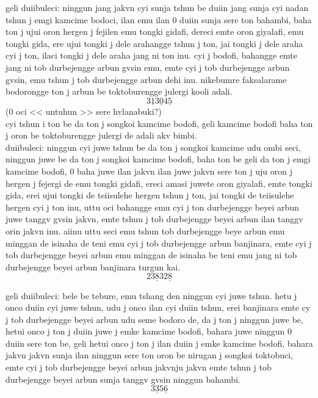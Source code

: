 \documentclass{report}
\begin{document}
geli duiibuleci: ninggun jang jakvn cyi sunja tshun be duiin jang sunja cyi nadan tshun j emgi kamcime bodoci, ilan emu ilan 0 duiin sunja sere ton bahambi, baha ton j ujui oron hergen j fejilen emu tongki gidafi, dereci emte oron giyalafi, emu tongki gida, ere ujui tongki j dele arahangge tshun j ton, jai tongki j dele araha cyi j ton, ilaci tongki j dele araha jang ni ton inu. cyi j bodofi, bahangge emte jang ni tob durbejengge arbun gvsin emu, emte cyi j tob durbejengge arbun gvsin, emu tshun j tob durbejengge arbun dehi inu. nikebumre faksalarame bodorongge ton j arbun be toktoburengge julergi kooli adali.
\[
    3\underline{1}3\underline{0}4\underline{5}
\]
(0 oci << untuhun >> sere hvlanabuki?)\\

cyi tshun i ton be da ton j songkoi kamcime bodofi, geli kamcime bodofi baha ton j oron be toktoburengge julergi de adali akv bimbi.\\
duiibuleci: ninggun cyi juwe tshun be da ton j songkoi kamcime udu ombi seci, ninggun juwe be da ton j songkoi kamcime bodofi, baha ton be geli da ton j emgi kamcime bodofi, 0 baha juwe ilan jakvn ilan juwe jakvn sere ton j uju oron j hergen j fejergi de emu tongki gidafi, ereci amasi juwete oron giyalafi, emte tongki gida, erei ujui tongki de teiisulehe hergen tshun j ton, jai tongki de teiisulehe hergen cyi j ton inu, uttu oci bahangge emu cyi j ton durbejengge beyei arbun juwe tanggv gvsin jakvn, emte tshun j tob durbejengge beyei arbun ilan tanggv orin jakvn inu. aiinu uttu seci emu tshun tob durbejengge beye arbun emu minggan de isinaha de teni emu cyi j tob durbejengge arbun banjinara, emte cyi j tob durbejengge beyei arbun emu minggan de isinaha be teni emu jang ni tob durbejengge beyei arbun banjinara turgun kai.
\[
    23\underline{8}32\underline{8}
\]

geli duiibuleci: bele be tebure, emu tshang den ninggun cyi juwe tshun. hetu j onco duiin cyi juwe tshun, udu j onco ilan cyi duiin tshun, erei banjinara emte cy j tob durbejengge beyei arbun udu seme bodoro de, da j ton j ninggun juwe be, hetui onco j ton j duiin juwe j emke kamcime bodofi, bahara juwe ninggun 0 duiin sere ton be, geli hetui onco j ton j ilan duiin j emke kamcime bodofi, bahara jakvn jakvn sunja ilan ninggun sere ton oron be nirugan j songkoi toktobuci, emte cyi j tob durbejengge beyei arbun jakvnju jakvn emte tshun j tob durbejengge beyei arbun sunja tanggv gvsin ninggun bahambi.
\[
    3\underline{3}5\underline{6}
\]
\end{document}
